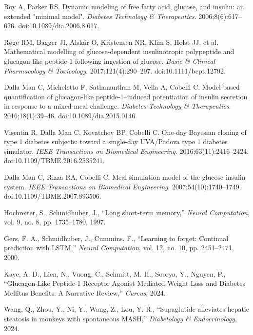 \documentclass[9pt,shortpaper,twoside,web]{ieeecolor}
\begin{document}
\begin{thebibliography}{00}
Roy A, Parker RS.
Dynamic modeling of free fatty acid, glucose, and insulin: an extended "minimal model".
\textit{Diabetes Technology \& Therapeutics}. 2006;8(6):617–626.
doi:10.1089/dia.2006.8.617. %

Røge RM, Bagger JI, Alskär O, Kristensen NR, Klim S, Holst JJ, et al.
Mathematical modelling of glucose-dependent insulinotropic polypeptide and glucagon-like peptide-1 following ingestion of glucose.
\textit{Basic \& Clinical Pharmacology \& Toxicology}. 2017;121(4):290–297.
doi:10.1111/bcpt.12792. %

Dalla Man C, Micheletto F, Sathananthan M, Vella A, Cobelli C.
Model-based quantification of glucagon-like peptide-1–induced potentiation of insulin secretion in response to a mixed-meal challenge.
\textit{Diabetes Technology \& Therapeutics}. 2016;18(1):39–46.
doi:10.1089/dia.2015.0146. %

Visentin R, Dalla Man C, Kovatchev BP, Cobelli C.
One-day Bayesian cloning of type 1 diabetes subjects: toward a single-day UVA/Padova type 1 diabetes simulator.
\textit{IEEE Transactions on Biomedical Engineering}. 2016;63(11):2416–2424.
doi:10.1109/TBME.2016.2535241. %

Dalla Man C, Rizza RA, Cobelli C.
Meal simulation model of the glucose-insulin system.
\textit{IEEE Transactions on Biomedical Engineering}. 2007;54(10):1740–1749.
doi:10.1109/TBME.2007.893506. %


Hochreiter, S., Schmidhuber, J., ``Long short-term memory,'' \textit{Neural Computation}, vol. 9, no. 8, pp. 1735–1780, 1997. 

Gers, F. A., Schmidhuber, J., Cummins, F., ``Learning to forget: Continual prediction with LSTM,'' \textit{Neural Computation}, vol. 12, no. 10, pp. 2451–2471, 2000. 

Kaye, A. D., Lien, N., Vuong, C., Schmitt, M. H., Soorya, Y., Nguyen, P., ``Glucagon-Like Peptide-1 Receptor Agonist Mediated Weight Loss and Diabetes Mellitus Benefits: A Narrative Review,'' \textit{Cureus}, 2024. 

Wang, Q., Zhou, Y., Ni, Y., Wang, Z., Lou, Y. R., ``Supaglutide alleviates hepatic steatosis in monkeys with spontaneous MASH,'' \textit{Diabetology \& Endocrinology}, 2024. 


\end{thebibliography}
\end{document}
